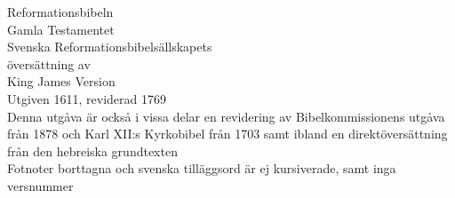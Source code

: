 \begin{center}
    {\fontsize{42}{50}\selectfont Reformationsbibeln} \\[1em]
    {\fontsize{20}{24}\selectfont 
    Gamla Testamentet}\\[1em]
    {\fontsize{12}{15}\selectfont Svenska Reformationsbibelsällskapets\\[0.5em]
    översättning av}\\[1.2em]
    {\fontsize{17}{20}\selectfont King James Version} \\[0.5em]
    {\fontsize{14}{17}\selectfont Utgiven 1611, reviderad 1769} \\[0.5em]
    {\fontsize{12}{15}\selectfont Denna utgåva är också i vissa delar en revidering av
    Bibelkommissionens utgåva från 1878 och Karl XII:s
    Kyrkobibel från 1703 samt ibland en direktöversättning
    från den hebreiska grundtexten}\\[2em]
    
    {\fontsize{11}{13}\selectfont *Fotnoter borttagna och svenska tilläggsord
    är ej kursiverade, samt inga versnummer}\\[1em]
\end{center}